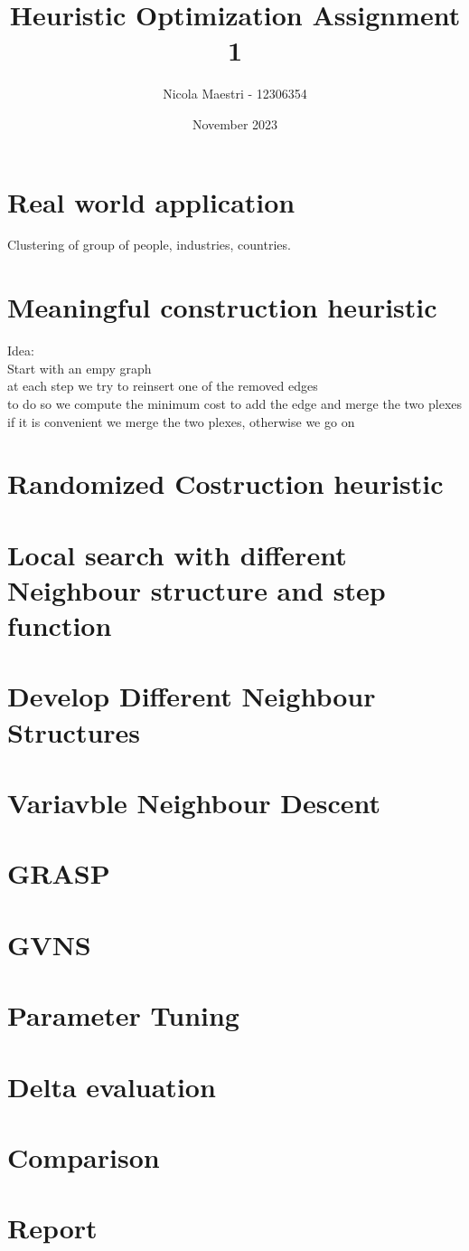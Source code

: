 \documentclass[a4paper, 12pt]{article}
\title{Heuristic Optimization Assignment 1}
\author{Nicola Maestri - 12306354}
\date{November 2023}
\begin{document}
\maketitle

\section*{Real world application}
Clustering of group of people, industries, countries.

\section*{Meaningful construction heuristic}
Idea:  \\
Start with an empy graph\\
at each step we try to reinsert one of the removed edges\\
to do so we compute the minimum cost to add the edge and merge the two plexes\\
if it is convenient we merge the two plexes, otherwise we go on\\

\section{Randomized Costruction heuristic}


\section{Local search with different Neighbour structure and step function}

\section{Develop Different Neighbour Structures}

\section{Variavble Neighbour Descent}

\section{GRASP}

\section{GVNS}

\section{Parameter Tuning}

\section{Delta evaluation}

\section{Comparison}

\section{Report}
\end{document}
